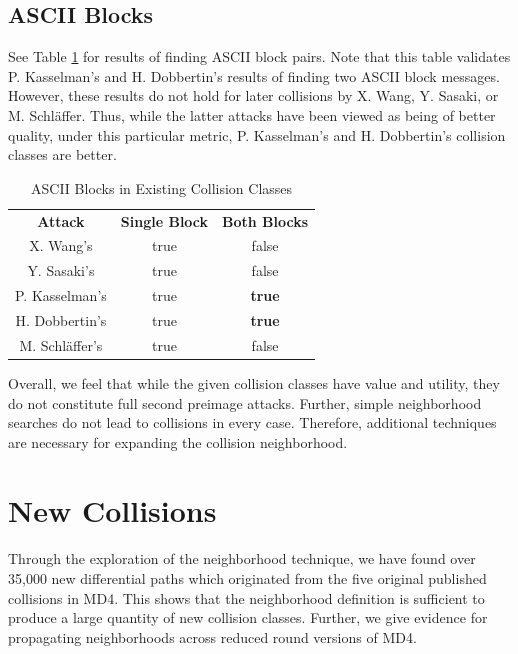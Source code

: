 \documentclass[conference]{IEEEtran}
\begin{document}
\subsection{ASCII Blocks}

See Table \ref{table:ascii} for results of finding ASCII block pairs. Note that
this table validates P. Kasselman's and H. Dobbertin's results of finding
two ASCII block messages. However, these results do not hold for later
collisions by X. Wang, Y. Sasaki, or M. Schl{\"a}ffer. Thus, while the latter
attacks have been viewed as being of better quality, under this particular
metric, P. Kasselman's and H. Dobbertin's collision classes are better.

\begin{table}
    \caption{ASCII Blocks in Existing Collision Classes}
    \label{table:ascii}
    \begin{tabular}{c c c}
        \textbf{Attack} & \textbf{Single Block} & \textbf{Both Blocks} \\
        X. Wang's & true & false \\
        Y. Sasaki's & true & false \\
        P. Kasselman's & true & \textbf{true} \\
        H. Dobbertin's & true & \textbf{true} \\
        M. Schl{\"a}ffer's & true & false \\
    \end{tabular}
\end{table}

Overall, we feel that while the given collision classes have value and utility,
they do not constitute full second preimage attacks. Further, simple
neighborhood searches do not lead to collisions in every case. Therefore,
additional techniques are necessary for expanding the collision neighborhood.

\section{New Collisions} \label{Sec:Collision}

Through the exploration of the neighborhood technique, we have found over
35,000 new differential paths which originated from the five original published
collisions in MD4. This shows that the neighborhood definition is sufficient
to produce a large quantity of new collision classes. Further, we give
evidence for propagating neighborhoods across reduced round versions of MD4.
\end{document}

